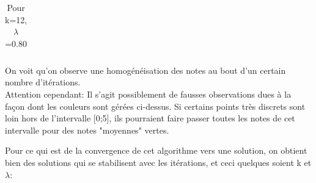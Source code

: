 \documentclass[12pt,a4paper]{article}
\begin{document}
\begin{table}[h]
\begin{tabular}{cccc}
\end{tabular}
\caption{Pour k=12, $\lambda$=0.80}
\end{table}

On voit qu'on observe une homogénéisation des notes au bout d'un certain nombre d'itérations.\\
Attention cependant: Il s'agit possiblement de fausses observations dues à la façon dont les couleurs sont gérées ci-dessus. 
Si certains points très discrets sont loin hors de l'intervalle [0;5], ils pourraient faire passer toutes les notes de cet intervalle pour des notes "moyennes" vertes.\\

\newpage

Pour ce qui est de la convergence de cet algorithme vers une solution, on obtient bien des solutions qui se stabilisent avec les itérations, et ceci quelques soient k et $\lambda$:
\end{document}
